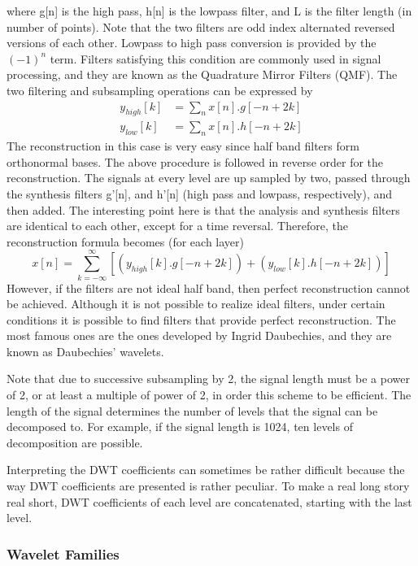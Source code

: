 \documentclass[12pt, a4paper, twoside]{report}
\begin{document}
where g[n] is the high pass, h[n] is the lowpass filter, and L is the filter length (in number of points). Note that the two filters are odd index alternated reversed versions of each other. Lowpass to high pass conversion is provided by the $(-1)^n$ term. Filters satisfying this condition are commonly used in signal processing, and they are known as the Quadrature Mirror Filters (QMF). The two filtering and subsampling operations can be expressed by
\begin{align*}
y_{high}[k] &= \sum_{n} x[n].g[-n+2k] \\ 
y_{low}[k] &= \sum_{n} x[n].h[-n+2k]
\end{align*}
The reconstruction in this case is very easy since half band filters form orthonormal bases. The above procedure is followed in reverse order for the reconstruction. The signals at every level are up sampled by two, passed through the synthesis filters g’[n], and h’[n] (high pass and lowpass, respectively), and then added. The interesting point here is that the analysis and synthesis filters are identical to each other, except for a time reversal. Therefore, the reconstruction formula becomes (for each layer)
\begin{equation*}
x[n] = \sum_{k=-\infty}^{\infty} \left [ \left ( y_{high}[k].g[-n+2k] \right ) + \left ( y_{low}[k].h[-n+2k] \right ) \right ]
\end{equation*}
However, if the filters are not ideal half band, then perfect reconstruction cannot be achieved. Although it is not possible to realize ideal filters, under certain conditions it is possible to find filters that provide perfect reconstruction. The most famous ones are the ones developed by Ingrid Daubechies, and they are known as Daubechies’ wavelets.
\par
Note that due to successive subsampling by 2, the signal length must be a power of 2, or at least a multiple of power of 2, in order this scheme to be efficient. The length of the signal determines the number of levels that the signal can be decomposed to. For example, if the signal length is 1024, ten levels of decomposition are possible.
\par 
Interpreting the DWT coefficients can sometimes be rather difficult because the way DWT coefficients are presented is rather peculiar. To make a real long story real short, DWT coefficients of each level are concatenated, starting with the last level.

\subsubsection{Wavelet Families}
\end{document}

